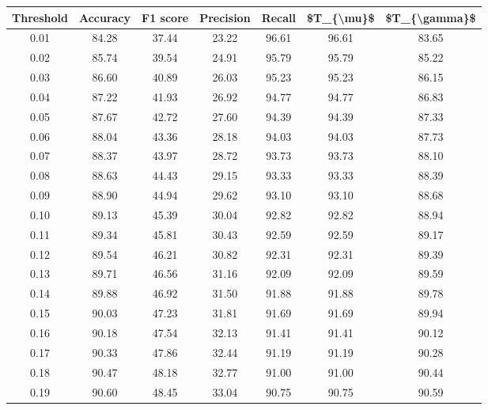 \begin{tabular}{|c|c|c|c|c|c|c|}
\hline
 Threshold &  Accuracy &  F1 score &  Precision &  Recall &  \$T\_\{\textbackslash mu\}\$ &  \$T\_\{\textbackslash gamma\}\$ \\
\hline
      0.01 &     84.28 &     37.44 &      23.22 &   96.61 &      96.61 &         83.65 \\
      0.02 &     85.74 &     39.54 &      24.91 &   95.79 &      95.79 &         85.22 \\
      0.03 &     86.60 &     40.89 &      26.03 &   95.23 &      95.23 &         86.15 \\
      0.04 &     87.22 &     41.93 &      26.92 &   94.77 &      94.77 &         86.83 \\
      0.05 &     87.67 &     42.72 &      27.60 &   94.39 &      94.39 &         87.33 \\
      0.06 &     88.04 &     43.36 &      28.18 &   94.03 &      94.03 &         87.73 \\
      0.07 &     88.37 &     43.97 &      28.72 &   93.73 &      93.73 &         88.10 \\
      0.08 &     88.63 &     44.43 &      29.15 &   93.33 &      93.33 &         88.39 \\
      0.09 &     88.90 &     44.94 &      29.62 &   93.10 &      93.10 &         88.68 \\
      0.10 &     89.13 &     45.39 &      30.04 &   92.82 &      92.82 &         88.94 \\
      0.11 &     89.34 &     45.81 &      30.43 &   92.59 &      92.59 &         89.17 \\
      0.12 &     89.54 &     46.21 &      30.82 &   92.31 &      92.31 &         89.39 \\
      0.13 &     89.71 &     46.56 &      31.16 &   92.09 &      92.09 &         89.59 \\
      0.14 &     89.88 &     46.92 &      31.50 &   91.88 &      91.88 &         89.78 \\
      0.15 &     90.03 &     47.23 &      31.81 &   91.69 &      91.69 &         89.94 \\
      0.16 &     90.18 &     47.54 &      32.13 &   91.41 &      91.41 &         90.12 \\
      0.17 &     90.33 &     47.86 &      32.44 &   91.19 &      91.19 &         90.28 \\
      0.18 &     90.47 &     48.18 &      32.77 &   91.00 &      91.00 &         90.44 \\
      0.19 &     90.60 &     48.45 &      33.04 &   90.75 &      90.75 &         90.59 \\

\end{tabular}

